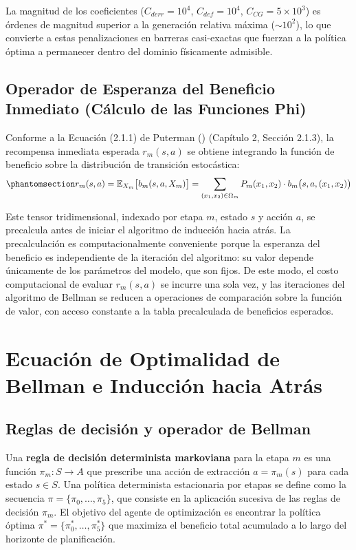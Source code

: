 \documentclass[
  spanish,
  letterpaper,
]{scrreprt}
\theoremstyle{definition}
\theoremstyle{remark}
\begin{document}
La magnitud de los coeficientes (\(C_{derr} = 10^4\),
\(C_{def} = 10^4\), \(C_{CG} = 5 \times 10^3\)) es órdenes de magnitud
superior a la generación relativa máxima (\(\sim 10^2\)), lo que
convierte a estas penalizaciones en barreras casi-exactas que fuerzan a
la política óptima a permanecer dentro del dominio físicamente
admisible.

\subsection{Operador de Esperanza del Beneficio Inmediato (Cálculo de
las Funciones Phi)}\label{sec-beneficio-esperado}

Conforme a la Ecuación (2.1.1) de Puterman
() (Capítulo 2, Sección 2.1.3),
la recompensa inmediata esperada \(r_m(s, a)\) se obtiene integrando la
función de beneficio sobre la distribución de transición estocástica:
\begin{equation}\protect\phantomsection\label{eq-beneficio-esperado}{
r_m(s, a) = \mathbb{E}_{X_m}\bigl[b_m(s, a, X_m)\bigr] = \sum_{(x_1, x_2) \in \Omega_m} P_m(x_1, x_2) \cdot b_m\bigl(s, a, (x_1, x_2)\bigr)
}\end{equation}

Este tensor tridimensional, indexado por etapa \(m\), estado \(s\) y
acción \(a\), se precalcula antes de iniciar el algoritmo de inducción
hacia atrás. La precalculación es computacionalmente conveniente porque
la esperanza del beneficio es independiente de la iteración del
algoritmo: su valor depende únicamente de los parámetros del modelo, que
son fijos. De este modo, el costo computacional de evaluar \(r_m(s, a)\)
se incurre una sola vez, y las iteraciones del algoritmo de Bellman se
reducen a operaciones de comparación sobre la función de valor, con
acceso constante a la tabla precalculada de beneficios esperados.

\section{Ecuación de Optimalidad de Bellman e Inducción hacia
Atrás}\label{sec-bellman}

\subsection{Reglas de decisión y operador de
Bellman}\label{reglas-de-decisiuxf3n-y-operador-de-bellman}

Una \textbf{regla de decisión determinista markoviana} para la etapa
\(m\) es una función \(\pi_m: S \to A\) que prescribe una acción de
extracción \(a = \pi_m(s)\) para cada estado \(s \in S\). Una política
determinista estacionaria por etapas se define como la secuencia
\(\pi = \{\pi_0, \ldots, \pi_5\}\), que consiste en la aplicación
sucesiva de las reglas de decisión \(\pi_m\). El objetivo del agente de
optimización es encontrar la política óptima
\(\pi^* = \{\pi_0^*, \ldots, \pi_5^*\}\) que maximiza el beneficio total
acumulado a lo largo del horizonte de planificación.
\end{document}
